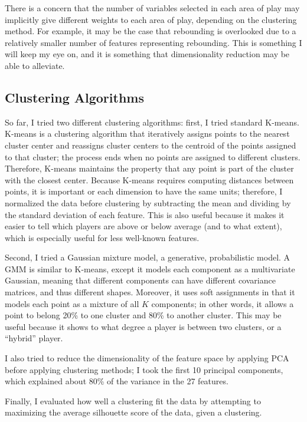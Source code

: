 \documentclass[12pt]{article}
\begin{document}
There is a concern that the number of variables selected in each area of play
may implicitly give different weights to each area of play, depending on the
clustering method. For example, it may be the case that rebounding is
overlooked due to a relatively smaller number of features representing
rebounding. This is something I will keep my eye on, and it is something that
dimensionality reduction may be able to alleviate.

\subsection{Clustering Algorithms} \label{algos}

So far, I tried two different clustering algorithms: first, I tried standard
K-means. K-means is a clustering algorithm that iteratively assigns points to
the nearest cluster center and reassigns cluster centers to the centroid of the
points assigned to that cluster; the process ends when no points are assigned
to different clusters. Therefore, K-means maintains the property that any point
is part of the cluster with the closest center. Because K-means requires
computing distances between points, it is important or each dimension to have
the same units; therefore, I normalized the data before clustering by
subtracting the mean and dividing by the standard deviation of each feature.
This is also useful because it makes it easier to tell which players are above
or below average (and to what extent), which is especially useful for less
well-known features.

Second, I tried a Gaussian mixture model, a generative, probabilistic model. A
GMM is similar to K-means, except it models each component as a multivariate
Gaussian, meaning that different components can have different covariance
matrices, and thus different shapes. Moreover, it uses soft assignments in that
it models each point as a mixture of all $K$ components; in other words, it
allows a point to belong 20\% to one cluster and 80\% to another cluster. This
may be useful because it shows to what degree a player is between two clusters,
or a ``hybrid'' player.

I also tried to reduce the dimensionality of the feature space by applying PCA before applying clustering methods; I took the first 10 principal components, which explained about 80\% of the variance in the 27 features.

Finally, I evaluated how well a clustering fit the data by attempting to
maximizing the average silhouette score of the data, given a clustering\cite{rousseeuw_1987}.
\end{document}
